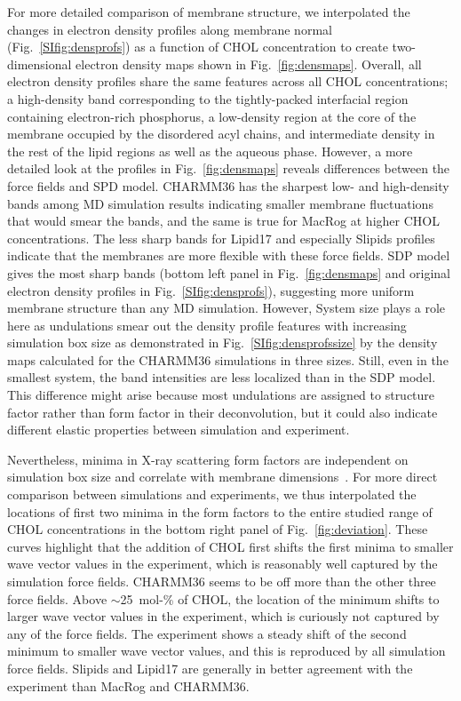 \documentclass[journal=jctcce]{achemso}
\begin{document}
For more detailed comparison of membrane structure, we interpolated the changes in electron density profiles along membrane normal (Fig.~\ref{SIfig:densprofs}) as a function of CHOL concentration to create two-dimensional electron density maps shown in Fig.~\ref{fig:densmaps}. Overall, all electron density profiles share the same features across all CHOL concentrations; a high-density band corresponding to the tightly-packed interfacial region containing electron-rich phosphorus, a low-density region at the core of the membrane occupied by the disordered acyl chains, and intermediate density in the rest of the lipid regions as well as the aqueous phase. However, a more detailed look at the profiles in Fig.~\ref{fig:densmaps} reveals differences between the force fields and SPD model. CHARMM36 has the sharpest low- and high-density bands among MD simulation results indicating smaller membrane fluctuations that would smear the bands, and the same is true for MacRog at higher CHOL concentrations. The less sharp bands for Lipid17 and especially Slipids profiles indicate that the membranes are more flexible with these force fields. SDP model gives the most sharp bands (bottom left panel in Fig.~\ref{fig:densmaps} and original electron density profiles in Fig.~\ref{SIfig:densprofs}), suggesting more uniform membrane structure than any MD simulation. However, System size plays a role here as  undulations smear out the density profile features with increasing simulation box size as demonstrated in Fig.~\ref{SIfig:densprofssize} by the density maps calculated for the CHARMM36 simulations in three sizes.  Still, even in the smallest system, the band intensities are less localized than in the SDP model. This difference might arise because most undulations are assigned to structure factor rather than form factor in their deconvolution, but it could also indicate different elastic properties between simulation and experiment.

Nevertheless, minima in X-ray scattering form factors are independent on simulation box size and correlate with membrane dimensions~\cite{NMRlipidsDatabank}. For more direct comparison between simulations and experiments, we thus interpolated the locations of first two minima in the form factors to the entire studied range of CHOL concentrations in the bottom right panel of Fig.~\ref{fig:deviation}. These curves highlight that the addition of CHOL first shifts the first minima to smaller wave vector values in the experiment, which is reasonably well captured by the simulation force fields. CHARMM36 seems to be off more than the other three force fields. Above $\sim$25~mol-\% of CHOL, the location of the minimum shifts to larger wave vector values in the experiment, which is curiously not captured by any of the force fields. The experiment shows a steady shift of the second minimum to smaller wave vector values, and this is reproduced by all simulation force fields. Slipids and Lipid17 are generally in better agreement with the experiment than MacRog and CHARMM36.
\end{document}
